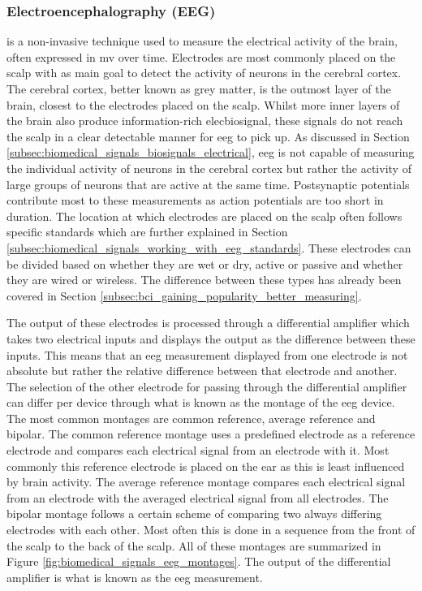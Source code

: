 
\subsubsection{Electroencephalography (EEG)}
\label{subsubsec:biomedical_signals_measuring_brain_modalities_eeg}

 is a non-invasive technique used to measure the electrical activity of the brain, often expressed in \gls{mv} over time.
Electrodes are most commonly placed on the scalp with as main goal to detect the activity of neurons in the cerebral cortex.
The cerebral cortex, better known as grey matter, is the outmost layer of the brain, closest to the electrodes placed on the scalp.
Whilst more inner layers of the brain also produce information-rich \gls{elecbiosignal}, these signals do not reach the scalp in a clear detectable manner for \gls{eeg} to pick up.
As discussed in Section \ref{subsec:biomedical_signals_biosignals_electrical}, \gls{eeg} is not capable of measuring the individual activity of neurons in the cerebral cortex but rather the activity of large groups of neurons that are active at the same time.
Postsynaptic potentials contribute most to these measurements as action potentials are too short in duration.
The location at which electrodes are placed on the scalp often follows specific standards which are further explained in Section \ref{subsec:biomedical_signals_working_with_eeg_standards}.
These electrodes can be divided based on whether they are wet or dry, active or passive and whether they are wired or wireless.
The difference between these types has already been covered in Section \ref{subsec:bci_gaining_popularity_better_measuring}.

The output of these electrodes is processed through a differential amplifier which takes two electrical inputs and displays the output as the difference between these inputs.
This means that an \gls{eeg} measurement displayed from one electrode is not absolute but rather the relative difference between that electrode and another.
The selection of the other electrode for passing through the differential amplifier can differ per device through what is known as the montage of the \gls{eeg} device.
The most common montages are common reference, average reference and bipolar.
The common reference montage uses a predefined electrode as a reference electrode and compares each electrical signal from an electrode with it.
Most commonly this reference electrode is placed on the ear as this is least influenced by brain activity.
The average reference montage compares each electrical signal from an electrode with the averaged electrical signal from all electrodes.
The bipolar montage follows a certain scheme of comparing two always differing electrodes with each other.
Most often this is done in a sequence from the front of the scalp to the back of the scalp.
All of these montages are summarized in Figure \ref{fig:biomedical_signals_eeg_montages}.
The output of the differential amplifier is what is known as the \gls{eeg} measurement.

